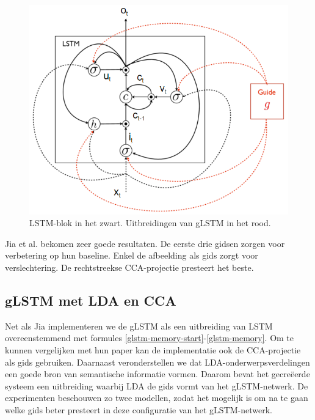 \begin{figure}[tb]
	\centering
	\includegraphics[width=\linewidth]{Images/jia}
	\caption{LSTM-blok in het zwart. Uitbreidingen van gLSTM in het rood\cite{Fernando2015}.}
	\label{fig:glstm}
\end{figure}

Jia et al. bekomen zeer goede resultaten. De eerste drie gidsen zorgen voor verbetering op hun baseline. Enkel de afbeelding als gids zorgt voor verslechtering. De rechtstreekse CCA-projectie presteert het beste.

\subsection{gLSTM met LDA en CCA}
Net als Jia implementeren we de gLSTM als een uitbreiding van LSTM overeenstemmend met formules \eqref{glstm-memory-start}-\eqref{glstm-memory}.
Om te kunnen vergelijken met hun paper kan de implementatie ook de CCA-projectie als gids gebruiken.
Daarnaast veronderstellen we dat LDA-onderwerpsverdelingen een goede bron van semantische informatie vormen. Daarom bevat het gecre\"eerde systeem een uitbreiding waarbij LDA de gids vormt van het gLSTM-netwerk.
De experimenten beschouwen zo twee modellen, zodat het mogelijk is om na te gaan welke gids beter presteert in deze configuratie van het gLSTM-netwerk.

